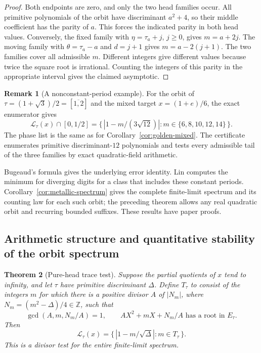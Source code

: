 \documentclass[11pt]{amsart}
\newtheorem{theorem}{Theorem}[section]
\theoremstyle{definition}
\newtheorem{remark}[theorem]{Remark}
\theoremstyle{remark}
\numberwithin{equation}{section}
\newcommand{\Z}{\mathbb{Z}}
\begin{document}
\begin{proof}
Both endpoints are zero, and only the two head families occur.
All primitive polynomials of the orbit have discriminant $a^2+4$,
so their middle coefficient has the parity of $a$. This forces the
indicated parity in both head values. Conversely, the fixed family
with $\eta=\tau_a+j$, $j\ge0$, gives $m=a+2j$. The moving family with
$\theta=\tau_a-a$ and $d=j+1$ gives $m=a-2(j+1)$.
The two families cover all admissible $m$. Different integers give
different values because twice the square root is irrational.
Counting the integers of this parity in the appropriate interval
gives the claimed asymptotic.
\end{proof}

\begin{remark}[A nonconstant-period example]
For the orbit of $\tau=(1+\sqrt3)/2=[\overline{1,2}]$ and the
mixed target $x=(1+e)/6$, the exact enumerator gives
\[
 \mathcal L_\tau(x)\cap[0,1/2]
   =\{\,|1-m/(3\sqrt{12})|:m\in\{6,8,10,12,14\}\,\}.
\]
The phase list is the same as for Corollary~\ref{cor:golden-mixed}.
The certificate enumerates primitive discriminant-$12$ polynomials
and tests every admissible tail of the three families by exact
quadratic-field arithmetic.
\end{remark}

Bugeaud's formula \cite[(3.4)]{BugeaudQuad} gives the underlying error
identity. Lin \cite[Lemma~4.2]{Lin2018} computes the minimum for
diverging digits for a class that includes these constant periods.
Corollary~\ref{cor:metallic-spectrum} gives the complete finite-limit
spectrum and its counting law for each such orbit; the preceding
theorem allows any real quadratic orbit and recurring bounded
suffixes. These results have paper proofs.


\subsection{Arithmetic structure and quantitative stability of the orbit spectrum}

\begin{theorem}[Pure-head trace test]\label{thm:pure-trace-test}
Suppose the partial quotients of $x$ tend to infinity, and let $\tau$
have primitive discriminant $\Delta$. Define $T_\tau$ to consist of
the integers $m$ for which there is a positive divisor $A$ of
$|N_m|$, where $N_m=(m^2-\Delta)/4\in\Z$, such that
\[
 \gcd(A,m,N_m/A)=1,\qquad
 A X^2+mX+N_m/A\text{ has a root in }E_\tau.
\]
Then
\[
 \mathcal L_\tau(x)=
 \{\,|1-m/\sqrt\Delta|:m\in T_\tau\,\}.
\]
This is a divisor test for the entire finite-limit spectrum.
\end{theorem}
\end{document}
